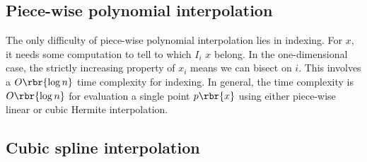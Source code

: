 \documentclass[english, nochinese]{pnote}
\begin{document}
\subsection{Piece-wise polynomial interpolation}

The only difficulty of piece-wise polynomial interpolation lies in indexing. For $x$, it needs some computation to tell to which $I_i$ $x$ belong. In the one-dimensional case, the strictly increasing property of $x_i$ means we can bisect on $i$. This involves a $ O \rbr{ \log n } $ time complexity for indexing. In general, the time complexity is $ O \rbr{ \log n } $ for evaluation a single point $ p \rbr{x} $ using either piece-wise linear or cubic Hermite interpolation.

\subsection{Cubic spline interpolation}
\end{document}
